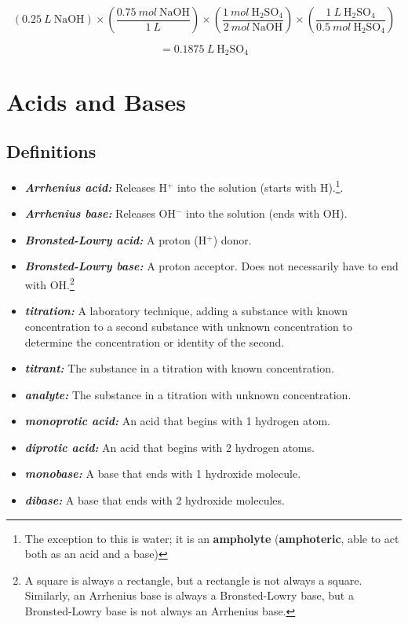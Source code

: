 \documentclass[a4paper, 12pt]{article}
\begin{document}
$$(0.25 \: L \: \text{NaOH}) \times \left(\frac{0.75 \: mol \: \text{NaOH}}{1 \: L}\right) \times \left(\frac{1 \: mol \: \text{H$_2$SO$_4$}}{2 \: mol \: \text{NaOH}}\right) \times \left(\frac{1 \: L \: \text{H$_2$SO$_4$}}{0.5 \: mol \: \text{H$_2$SO$_4$}}\right)$$

$$= \boxed{0.1875 \: L \: \text{H$_2$SO$_4$}}$$

\section{Acids and Bases}

\subsection{Definitions}
\begin{itemize}[leftmargin=*, nosep]
    \item \textbf{\textit{Arrhenius acid:}} Releases H$^+$ into the solution (starts with H).\footnote{The exception to this is water; it is an \textbf{ampholyte} (\textbf{amphoteric}, able to act both as an acid and a base)}.
    \item \textbf{\textit{Arrhenius base:}} Releases OH$^-$ into the solution (ends with OH).
    \item \textbf{\textit{Bronsted-Lowry acid:}} A proton (H$^+$) donor.
    \item \textbf{\textit{Bronsted-Lowry base:}} A proton acceptor. Does not necessarily have to end with OH.\footnote{A square is always a rectangle, but a rectangle is not always a square. Similarly, an Arrhenius base is always a Bronsted-Lowry base, but a Bronsted-Lowry base is not always an Arrhenius base.}
    \item \textbf{\textit{titration:}} A laboratory technique, adding a substance with known concentration to a second substance with unknown concentration to determine the concentration or identity of the second.
    \item \textbf{\textit{titrant:}} The substance in a titration with known concentration.
    \item \textbf{\textit{analyte:}} The substance in a titration with unknown concentration.
    \item \textbf{\textit{monoprotic acid:}} An acid that begins with 1 hydrogen atom.
    \item \textbf{\textit{diprotic acid:}} An acid that begins with 2 hydrogen atoms.
    \item \textbf{\textit{monobase:}} A base that ends with 1 hydroxide molecule.
    \item \textbf{\textit{dibase:}} A base that ends with 2 hydroxide molecules.
\end{itemize}
\end{document}
